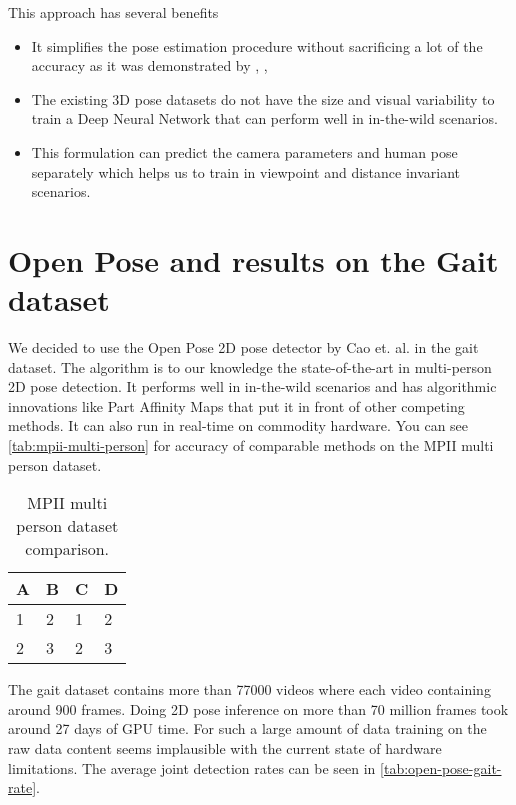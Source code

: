 This approach has several benefits
\begin{itemize}
    \item It simplifies the pose estimation procedure without sacrificing a lot of the accuracy as it was demonstrated by \parencite{martinez2017simple}, \parencite{sun2017compositional}, \parencite{hossain2017exploiting}
    \item The existing 3D pose datasets do not have the size and visual variability to train a Deep Neural Network that can perform well in in-the-wild scenarios.
    \item This formulation can predict the camera parameters and human pose separately which helps us to train in viewpoint and distance invariant scenarios.
\end{itemize}

\section{Open Pose and results on the Gait dataset}

We decided to use the Open Pose 2D pose detector by Cao et. al. \parencite{cao2016realtime} in the gait dataset. The algorithm is to our knowledge the state-of-the-art in multi-person 2D pose detection. It performs well in in-the-wild scenarios and has algorithmic innovations like Part Affinity Maps that put it in front of other competing methods. It can also run in real-time on commodity hardware. You can see \autoref{tab:mpii-multi-person} for accuracy of comparable methods on the MPII multi person dataset.

\begin{table}[htpb]
    \centering
    \begin{tabular}{l l l l}
      \toprule
        A & B & C & D \\
      \midrule
        1 & 2 & 1 & 2 \\
        2 & 3 & 2 & 3 \\
      \bottomrule
    \end{tabular}
    \caption[2D Pose Comparison]{MPII multi person dataset comparison.}\label{tab:mpii-multi-person}
  \end{table}

The gait dataset contains more than 77000 videos where each video containing around 900 frames. Doing 2D pose inference on more than 70 million frames took around 27 days of GPU time. For such a large amount of data training on the raw data content seems implausible with the current state of hardware limitations. The average joint detection rates can be seen in \autoref{tab:open-pose-gait-rate}.

